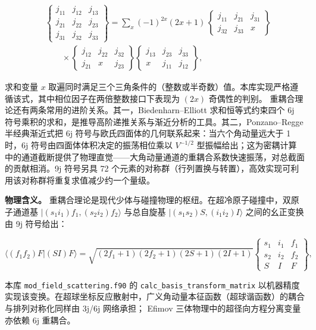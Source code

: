 \documentclass[
]{ctexbook}
\begin{document}
\[
\begin{aligned}
&\begin{Bmatrix} j_{11} & j_{12} & j_{13} \\ j_{21} & j_{22} & j_{23} \\ j_{31} & j_{32} & j_{33} \end{Bmatrix}
=\sum_{x}(-1)^{2x}(2x+1)\,
\begin{Bmatrix} j_{11} & j_{21} & j_{31} \\ j_{32} & j_{33} & x \end{Bmatrix} \\
&\qquad\times
\begin{Bmatrix} j_{12} & j_{22} & j_{32} \\ j_{21} & x & j_{23} \end{Bmatrix}
\begin{Bmatrix} j_{13} & j_{23} & j_{33} \\ x & j_{11} & j_{12} \end{Bmatrix},
\end{aligned}
\]

求和变量 \(x\)
取遍同时满足三个三角条件的（整数或半奇数）值。本库实现严格遵循该式，其中相位因子在两倍整数接口下表现为
\((2x)\) 奇偶性的判别。
重耦合理论还有两条常用的进阶关系。其一，Biedenharn--Elliott
求和恒等式约束四个 6j
符号乘积的求和，是推导高阶递推关系与渐近分析的工具。其二，Ponzano--Regge
半经典渐近式把 6j 符号与欧氏四面体的几何联系起来：当六个角动量远大于 1
时，6j 符号由四面体体积决定的振荡相位乘以 \(V^{-1/2}\)
型振幅给出；这为密耦计算中的通道截断提供了物理直觉------大角动量通道的重耦合系数快速振荡，对总截面的贡献相消。9j
符号另具 72
个元素的对称群（行列置换与转置），高效实现可利用该对称群将重复求值减少约一个量级。

\textbf{物理含义。}
重耦合理论是现代少体与碰撞物理的枢纽。在超冷原子碰撞中，双原子通道基
\(|(s_1i_1)f_1,(s_2i_2)f_2\rangle\) 与总自旋基
\(|(s_1s_2)S,(i_1i_2)I\rangle\) 之间的幺正变换由 9j 符号给出：

\[\langle (f_1f_2)F | (SI)F \rangle
=\sqrt{(2f_1+1)(2f_2+1)(2S+1)(2I+1)}
\begin{Bmatrix} s_1 & i_1 & f_1 \\ s_2 & i_2 & f_2 \\ S & I & F \end{Bmatrix},\]

本库 \texttt{mod\_field\_scattering.f90} 的
\texttt{calc\_basis\_transform\_matrix}
以机器精度实现该变换。在超球坐标反应散射中，广义角动量本征函数（超球谐函数）的耦合与排列对称化同样由
3j/6j 网络承担； Efimov 三体物理中的超径向方程分离变量亦依赖 6j 重耦合。
\end{document}
